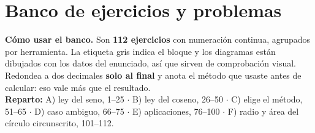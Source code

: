 \documentclass[12pt, letterpaper]{article}
\begin{document}
\clearpage
\section{Banco de ejercicios y problemas}

\begin{cuadroinfo}
  \small
  \textbf{Cómo usar el banco.} Son \textbf{112 ejercicios} con numeración
  continua, agrupados por herramienta. La etiqueta gris indica el bloque y los
  diagramas están dibujados con los datos del enunciado, así que sirven de
  comprobación visual. Redondea a dos decimales \textbf{solo al final} y anota
  el método que usaste antes de calcular: eso vale más que el resultado.
  \\[4pt]
  \textbf{Reparto:} A) ley del seno, 1--25 $\cdot$ B) ley del coseno, 26--50
  $\cdot$ C) elige el método, 51--65 $\cdot$ D) caso ambiguo, 66--75
  $\cdot$ E) aplicaciones, 76--100 $\cdot$ F) radio y área del círculo
  circunscrito, 101--112.
\end{cuadroinfo}
\end{document}
